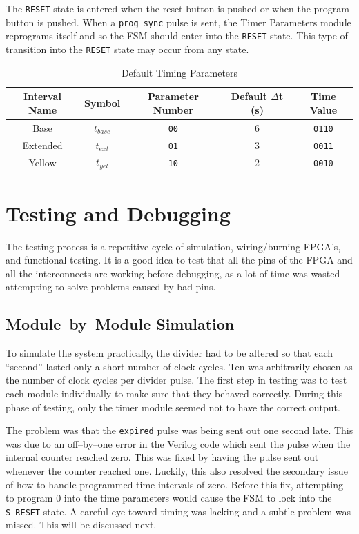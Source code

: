 \documentclass{article}
\begin{document}
	The \texttt{RESET} state is entered when the reset button is pushed or
	when the program button is pushed.
	When a \texttt{prog\_sync} pulse is sent, the Timer Parameters module
	reprograms itself and so the FSM should enter into the \texttt{RESET}
	state.  This type of transition into the \texttt{RESET} state may occur
	from any state.
	
	\begin{table}
	\centering
		\begin{tabular}{|c|c|c|c|c|}
		\hline
		Interval Name & Symbol & Parameter Number & Default $\Delta$t (s) & Time Value \\ \hline
		Base & $t_{base}$ & \texttt{00} & 6 & \texttt{0110} \\ \hline
		Extended & $t_{ext}$ & \texttt{01} & 3 & \texttt{0011} \\ \hline
		Yellow & $t_{yel}$ & \texttt{10} & 2 & \texttt{0010} \\ \hline
		\end{tabular}
	\caption{Default Timing Parameters}
	\label{tbl:timeparam}
	\end{table}


\section{Testing and Debugging}
	The testing process is a repetitive cycle of simulation, wiring/burning
	FPGA's, and functional testing.  It is a good idea to test that all the
	pins of the FPGA and all the interconnects are working before debugging, as
	a lot of time was wasted attempting to solve problems caused by bad pins.

	\subsection{Module--by--Module Simulation}
	To simulate the system practically, the divider had to be altered so
	that each ``second'' lasted only a short number of clock cycles.  Ten
	was arbitrarily chosen as the number of clock cycles per divider pulse.
	The first step in testing was to test each module individually to make
	sure that they behaved correctly.  During this phase of testing, only
	the timer module seemed not to have the correct output.
	
	The problem was that the \texttt{expired} pulse was being sent out one
	second late.  This was due to an off--by--one error in the Verilog code
	which sent the pulse when the internal counter reached zero.  This was
	fixed by having the pulse sent out whenever the counter reached one.
	Luckily, this also resolved the secondary issue of how to handle programmed
	time intervals of zero.  Before this fix, attempting to program 0 into the
	time parameters would cause the FSM to lock into the \texttt{S\_RESET}
	state.  A careful eye toward timing was lacking and a subtle problem was
	missed.  This will be discussed next.
\end{document}
